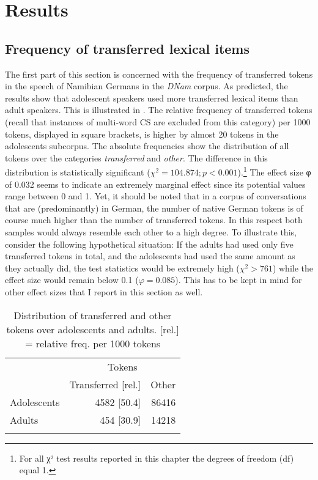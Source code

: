 \documentclass[output=paper]{langsci/langscibook}
\begin{document}
 
\section{Results}\label{sec:bracke:5}
\subsection{Frequency of transferred lexical items}\label{sec:bracke:5.1}

The first part of this section is concerned with the frequency of transferred tokens in the speech of Namibian Germans in the \textit{DNam} corpus. As predicted, the results show that adolescent speakers used more transferred lexical items than adult speakers. This is illustrated in . The relative frequency of transferred tokens (recall that instances of multi-word CS are excluded from this category) per 1000 tokens, displayed in square brackets, is higher by almost 20 tokens in the adolescents subcorpus. The absolute frequencies show the distribution of all tokens over the categories \textit{transferred} and \textit{other}. The difference in this distribution is statistically significant ($\chi^2 = 104.874; p < 0.001$).\footnote{For all χ² test results reported in this chapter the degrees of freedom (df) equal 1.} The effect size φ of 0.032 seems to indicate an extremely marginal effect since its potential values range between 0 and 1. Yet, it should be noted that in a corpus of conversations that are (predominantly) in German, the number of native German tokens is of course much higher than the number of transferred tokens. In this respect both samples would always resemble each other to a high degree. To illustrate this, consider the following hypothetical situation: If the adults had used only five transferred tokens in total, and the adolescents had used the same amount as they actually did, the test statistics would be extremely high ($\chi^2 > 761$) while the effect size would remain below 0.1 ($\varphi = 0.085$). This has to be kept in mind for other effect sizes that I report in this section as well.

  
\begin{table}
\begin{tabular}{lrr} 
\lsptoprule
& \multicolumn{2}{c}{Tokens}\\\cmidrule(lr){2-3}
& Transferred [rel.] & Other\\
\midrule
Adolescents & 4582 [50.4] & 86416\\
Adults & 454 [30.9] & 14218\\
\lspbottomrule
\end{tabular}
\caption{Distribution of transferred and other tokens over adolescents and adults. {[}rel.{]} = relative freq. per 1000 tokens\label{tab:bracke:3}}
\end{table}  
\end{document}
